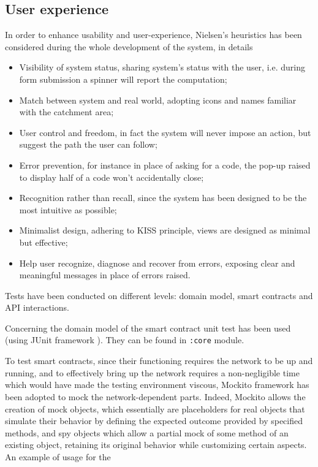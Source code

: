 \documentclass{scrartcl}
\begin{document}
\subsection{User experience}

In order to enhance usability and user-experience, Nielsen's heuristics has been considered during the whole development of the system, in details
\begin{itemize}
    \item Visibility of system status, sharing system's status with the user, i.e. during form submission a spinner will report the computation;
    \item Match between system and real world, adopting icons and names familiar with the catchment area;
    \item User control and freedom, in fact the system will never impose an action, but suggest the path the user can follow;
    \item Error prevention, for instance in place of asking for a code, the pop-up raised to display half of a code won't accidentally close;
    \item Recognition rather than recall, since the system has been designed to be the most intuitive as possible;
    \item Minimalist design, adhering to KISS principle, views are designed as minimal but effective;
    \item Help user recognize, diagnose and recover from errors, exposing clear and meaningful messages in place of errors raised.
\end{itemize}

\iffalse

Tests have been conducted on different levels: domain model, smart contracts and API interactions.

Concerning the domain model of the smart contract unit test has been used (using JUnit framework \cite{junit}).
%
They can be found in \texttt{:core} module.

To test smart contracts, since their functioning requires the network to be up and running, and to effectively bring up the network requires a non-negligible time which would have made the testing environment viscous, Mockito framework \cite{mockito} has been adopted to mock the network-dependent parts.
%
Indeed, Mockito allows the creation of mock objects, which essentially are placeholders for real objects that simulate their behavior by defining the expected outcome provided by specified methods, and spy objects which allow a partial mock of some method of an existing object, retaining its original behavior while customizing certain aspects.
%
An example of usage for the 
\end{document}
